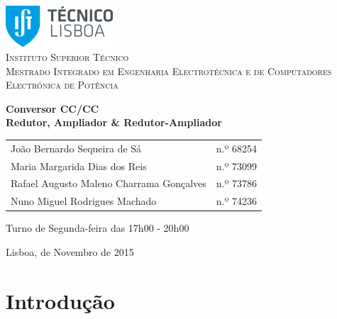 \documentclass[a4paper,11pt]{article}
\numberwithin{equation}{section}
\begin{document}
\begin{titlepage}
\begin{center}

\hfill \break
\hfill \break

\includegraphics[width=0.3\textwidth]{img/logo}~\\[1cm] 

\textsc{\LARGE Instituto Superior Técnico}\\[0.25cm]
\textsc{\Large Mestrado Integrado em Engenharia Electrotécnica e de Computadores}\\[1.8cm]
\textsc{\huge Electrónica de Potência}\\[0.25cm]

\vspace{6mm}

{\huge \bfseries Conversor CC/CC \\[0.7cm]}
{\bfseries Redutor, Ampliador \& Redutor-Ampliador \\[1cm]}

\begin{tabular}{ l l }
	João Bernardo Sequeira de Sá & \hspace{2mm} n.º 68254 \\
	Maria Margarida Dias dos Reis & \hspace{2mm} n.º 73099 \\
	Rafael Augusto Maleno Charrama Gonçalves & \hspace{2mm} n.º 73786 \\
	Nuno Miguel Rodrigues Machado & \hspace{2mm} n.º 74236
\end{tabular}

\vspace{7mm}

Turno de Segunda-feira das 17h00 - 20h00

\vfill

{\large Lisboa,  de Novembro de 2015} 
	
\end{center}
\end{titlepage}
	
\tableofcontents
\pagebreak

\section{Introdução}
\end{document}
